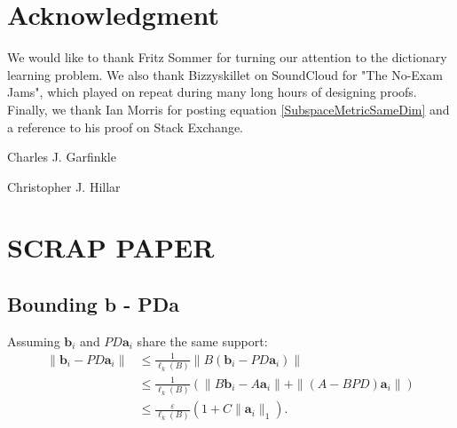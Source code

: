 \documentclass[journal, onecolumn]{IEEEtran}
\begin{document}

\section*{Acknowledgment}
We would like to thank Fritz Sommer for turning our attention to the dictionary learning problem. We also thank Bizzyskillet on SoundCloud for "The No-Exam Jams", which played on repeat during many long hours of designing proofs. Finally, we thank Ian Morris for posting equation \eqref{SubspaceMetricSameDim} and a reference to his proof on Stack Exchange.






\begin{IEEEbiographynophoto}{Charles J. Garfinkle}
\end{IEEEbiographynophoto}

\begin{IEEEbiographynophoto}{Christopher J. Hillar}
\end{IEEEbiographynophoto}


\section*{SCRAP PAPER}

\subsection{Bounding b - PDa}

Assuming $\mathbf{b}_i$ and $PD\mathbf{a}_i$ share the same support:
\begin{align*}
\|\mathbf{b}_i - PD\mathbf{a}_i\| 
&\leq \frac{1}{\ell_{k}(B)}\|B(\mathbf{b}_i - PD\mathbf{a}_i)\| \\
&\leq \frac{1}{\ell_{k}(B)} (\|B\mathbf{b}_i - A\mathbf{a}_i\| + \|(A - BPD)\mathbf{a}_i\|) \\
&\leq \frac{\varepsilon}{\ell_{k}(B)}(1+C\|\mathbf{a}_i\|_1).
\end{align*}
\end{document}
